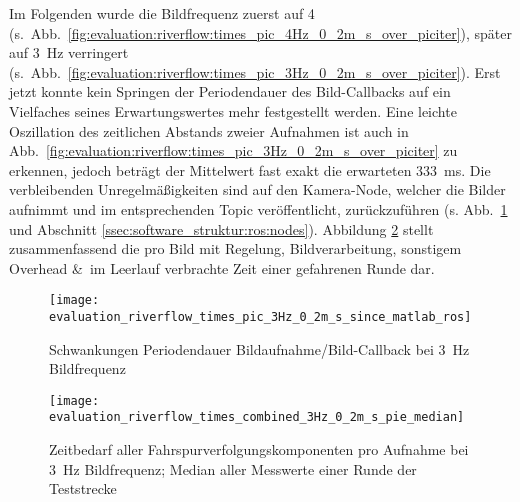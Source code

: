 Im Folgenden wurde die Bildfrequenz zuerst auf 4 (s.~Abb.~\ref{fig:evaluation:riverflow:times_pic_4Hz_0_2m_s_over_piciter}), später auf \SI{3}{\hertz} verringert (s.~Abb.~\ref{fig:evaluation:riverflow:times_pic_3Hz_0_2m_s_over_piciter}). Erst jetzt konnte kein Springen der Periodendauer des Bild-Callbacks auf ein Vielfaches seines Erwartungswertes mehr festgestellt werden. Eine leichte Oszillation des zeitlichen Abstands zweier Aufnahmen ist auch in Abb.~\ref{fig:evaluation:riverflow:times_pic_3Hz_0_2m_s_over_piciter} zu erkennen, jedoch beträgt der Mittelwert fast exakt die erwarteten \SI{333}{ms}. Die verbleibenden Unregelmäßigkeiten sind auf den Kamera-Node, welcher die Bilder aufnimmt und im entsprechenden Topic veröffentlicht, zurückzuführen (s. Abb.~\ref{fig:evaluation:riverflow:times_pic_3Hz_0_2m_s_since_matlab_ros} und Abschnitt \ref{ssec:software_struktur:ros:nodes}). Abbildung \ref{fig:evaluation:riverflow:times_combined_3Hz_0_2m_s_pie_median} 
stellt zusammenfassend die pro Bild mit Regelung, Bildverarbeitung, sonstigem Overhead \&\ im Leerlauf verbrachte Zeit einer gefahrenen Runde dar.

\begin{figure}[htbp]
\centering
\texttt{[image: evaluation\_riverflow\_times\_pic\_3Hz\_0\_2m\_s\_since\_matlab\_ros]}
\caption{Schwankungen Periodendauer Bildaufnahme/Bild-Callback bei \SI{3}{\hertz} Bildfrequenz}
\label{fig:evaluation:riverflow:times_pic_3Hz_0_2m_s_since_matlab_ros}
\end{figure}

\begin{figure}[htbp] %
	\centering
	\texttt{[image: evaluation\_riverflow\_times\_combined\_3Hz\_0\_2m\_s\_pie\_median]}
	\caption{Zeitbedarf aller Fahrspurverfolgungskomponenten pro Aufnahme bei \SI{3}{\hertz} Bildfrequenz; Median aller Messwerte einer Runde der Teststrecke}
	\label{fig:evaluation:riverflow:times_combined_3Hz_0_2m_s_pie_median}
\end{figure}


